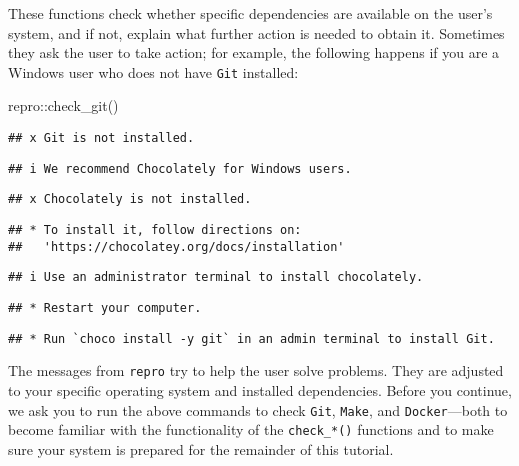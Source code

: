 \documentclass[psych,tutorial,accept,moreauthors,pdftex]{Definitions/mdpi}
\newenvironment{Shaded}{\begin{snugshade}}{\end{snugshade}}
\newcommand{\FunctionTok}[1]{\textcolor[rgb]{0.00,0.00,0.00}{#1}}
\newcommand{\NormalTok}[1]{#1}
\newcommand{\SpecialCharTok}[1]{\textcolor[rgb]{0.00,0.00,0.00}{#1}}
\begin{document}
\begin{paracol}{2}
\switchcolumn


These functions check whether specific dependencies are available on the
user's system, and if not, explain what further action is needed to
obtain it. Sometimes they ask the user to take action; for example, the
following happens if you are a Windows user who does not have
\texttt{Git} installed:

\begin{adjustwidth}{0.5cm}{0cm} 
\begin{Shaded}
\begin{Highlighting}[]
\NormalTok{repro}\SpecialCharTok{::}\FunctionTok{check\_git}\NormalTok{()}
\end{Highlighting}
\end{Shaded}

\begin{verbatim}
## x Git is not installed.
\end{verbatim}

\begin{verbatim}
## i We recommend Chocolately for Windows users.
\end{verbatim}

\begin{verbatim}
## x Chocolately is not installed.
\end{verbatim}

\begin{verbatim}
## * To install it, follow directions on: 
##   'https://chocolatey.org/docs/installation'
\end{verbatim}

\begin{verbatim}
## i Use an administrator terminal to install chocolately.
\end{verbatim}

\begin{verbatim}
## * Restart your computer.
\end{verbatim}

\begin{verbatim}
## * Run `choco install -y git` in an admin terminal to install Git.
\end{verbatim}
\end{adjustwidth}

The messages from \texttt{repro} try to help the user solve problems.
They are adjusted to your specific operating system and installed
dependencies. Before you continue, we ask you to run the above commands
to check \texttt{Git}, \texttt{Make}, and \texttt{Docker}---both to
become familiar with the functionality of the \texttt{check\_*()}
functions and to make sure your system is prepared for the remainder of
this tutorial.


\end{paracol}
\end{document}
